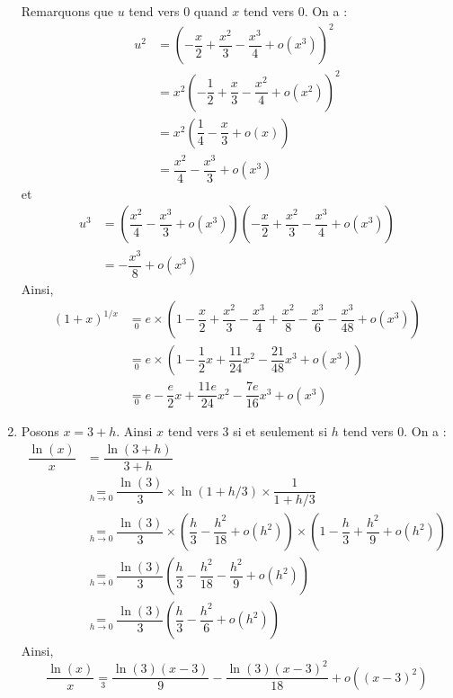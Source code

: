 \documentclass[a4paper,10pt]{report}
\begin{document}
\begin{enumerate}
 Remarquons que $u$ tend vers $0$ quand $x$ tend vers $0$. On a :
 \begin{align*}
 u^2 & = \left(-\dfrac{x}{2} + \dfrac{x^2}{3} - \dfrac{x^3}{4} + o(x^3)\right)^2\\
 &  = x^2  \left(-\dfrac{1}{2} + \dfrac{x}{3} - \dfrac{x^2}{4} + o(x^2)\right)^2 \\
 & = x^2 \left( \dfrac{1}{4} - \dfrac{x}{3} + o(x) \right) \\
 & = \dfrac{x^2}{4} - \dfrac{x^3}{3} + o(x^3)
 \end{align*}
 et 
  \begin{align*}
 u^3 & =\left(\dfrac{x^2}{4} - \dfrac{x^3}{3} + o(x^3) \right) \left( -\dfrac{x}{2} + \dfrac{x^2}{3} - \dfrac{x^3}{4} + o(x^3) \right) \\
 & = - \dfrac{x^3}{8} + o(x^3) 
 \end{align*}
 Ainsi,
 \begin{align*}
 (1+x)^{1/x} & \underset{0}{=} e \times  \left(1 -\dfrac{x}{2} + \dfrac{x^2}{3} - \dfrac{x^3}{4} + \dfrac{x^2}{8} - \dfrac{x^3}{6} - \dfrac{x^3}{48} + o(x^3) \right) \\
 &  \underset{0}{=} e \times \left(1- \dfrac{1}{2}x + \dfrac{11}{24}x^2 - \dfrac{21}{48}x^3 + o(x^3) \right) \\
 & \underset{0}{=}  e- \dfrac{e}{2}x + \dfrac{11e}{24}x^2 - \dfrac{7e}{16}x^3 + o(x^3)
 \end{align*}
 \item Posons $x=3+h$. Ainsi $x$ tend vers $3$ si et seulement si $h$ tend vers $0$. On a :
 \begin{align*}
 \dfrac{\ln(x)}{x} & = \dfrac{\ln(3+h)}{3+h} \\
 &  \underset{h \rightarrow 0}{=} \dfrac{\ln(3)}{3} \times \ln(1+h/3) \times \dfrac{1}{1+h/3} \\
 & \underset{h \rightarrow 0}{=}  \dfrac{\ln(3)}{3} \times \left( \dfrac{h}{3} -\dfrac{h^2}{18}+ o(h^2) \right) \times \left(1- \dfrac{h}{3}+ \dfrac{h^2}{9}  + o(h^2) \right) \\
 & \underset{h \rightarrow 0}{=}\dfrac{\ln(3)}{3} \left( \dfrac{h}{3} -\dfrac{h^2}{18}  - \dfrac{h^2}{9}+o(h^2)\right)\\
  & \underset{h \rightarrow 0}{=}\dfrac{\ln(3)}{3} \left( \dfrac{h}{3} -\dfrac{h^2}{6}   +o(h^2)\right)
 \end{align*}
 Ainsi,
$$ \dfrac{\ln(x)}{x} \underset{3}{=}  \dfrac{\ln(3)(x-3)}{9} -  \dfrac{\ln(3)(x-3)^2}{18}   +o((x-3)^2)$$
\end{enumerate}
\end{document}
